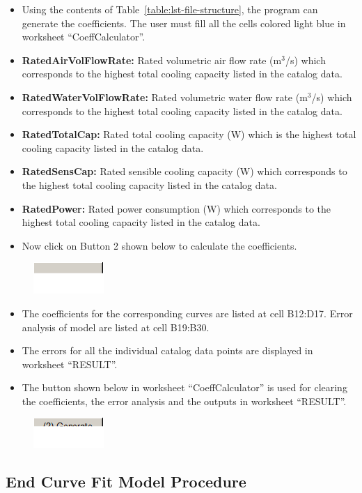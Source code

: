\begin{itemize}
\item
  Using the contents of Table~\ref{table:lst-file-structure}, the program can generate the coefficients. The user must fill all the cells colored light blue in worksheet ``CoeffCalculator''.
\item
  \textbf{RatedAirVolFlowRate:} Rated volumetric air flow rate (m\(^{3}\)/s) which corresponds to the highest total cooling capacity listed in the catalog data.
\item
  \textbf{RatedWaterVolFlowRate:} Rated volumetric water flow rate (m\(^{3}\)/s) which corresponds to the highest total cooling capacity listed in the catalog data.
\item
  \textbf{RatedTotalCap:} Rated total cooling capacity (W) which is the highest total cooling capacity listed in the catalog data.
\item
  \textbf{RatedSensCap:} Rated sensible cooling capacity (W) which corresponds to the highest total cooling capacity listed in the catalog data.
\item
  \textbf{RatedPower:} Rated power consumption (W) which corresponds to the highest total cooling capacity listed in the catalog data.
\item
  Now click on Button 2 shown below to calculate the coefficients.
\end{itemize}

\begin{figure}[htbp]
\centering
\includegraphics{media/image052.png}
\caption{}
\end{figure}

\begin{itemize}
\item
  The coefficients for the corresponding curves are listed at cell B12:D17. Error analysis of model are listed at cell B19:B30.
\item
  The errors for all the individual catalog data points are displayed in worksheet ``RESULT''.
\item
  The button shown below in worksheet ``CoeffCalculator'' is used for clearing the coefficients, the error analysis and the outputs in worksheet ``RESULT''.
\end{itemize}

\begin{figure}[htbp]
\centering
\includegraphics{media/image053.png}
\caption{}
\end{figure}

\subsection{End Curve Fit Model Procedure}\label{end-curve-fit-model-procedure-000}
